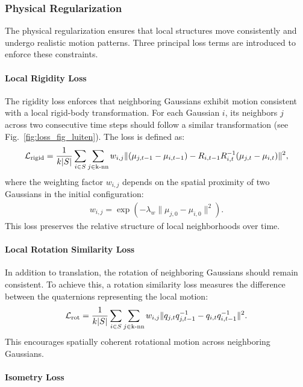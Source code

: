 \subsubsection{Physical Regularization}

The physical regularization ensures that local structures move consistently and undergo realistic motion patterns. 
Three principal loss terms are introduced to enforce these constraints.

\paragraph{Local Rigidity Loss}

The rigidity loss enforces that neighboring Gaussians exhibit motion consistent with a local rigid-body transformation. 
For each Gaussian \(i\), its neighbors \(j\) across two consecutive time steps should follow a similar transformation (see Fig.~\ref{fig:loss_fig_luiten}). 
The loss is defined as:
\begin{align}
\mathcal{L}_{\mathrm{rigid}} = \frac{1}{k|S|} \sum_{i \in S} \sum_{j \in \text{k-nn}} w_{i,j} \|(\mu_{j,t-1} - \mu_{i,t-1}) - R_{i,t-1} R_{i,t}^{-1} (\mu_{j,t} - \mu_{i,t})\|^2,
\end{align}
where the weighting factor \(w_{i,j}\) depends on the spatial proximity of two Gaussians in the initial configuration:
\begin{align}
w_{i,j} = \exp \left( -\lambda_w \|\mu_{j,0} - \mu_{i,0}\|^2 \right).
\end{align}
This loss preserves the relative structure of local neighborhoods over time.

\paragraph{Local Rotation Similarity Loss}

In addition to translation, the rotation of neighboring Gaussians should remain consistent. 
To achieve this, a rotation similarity loss measures the difference between the quaternions representing the local motion:
\begin{align}
\mathcal{L}_{\mathrm{rot}} = \frac{1}{k|S|} \sum_{i \in S} \sum_{j \in \text{k-nn}} w_{i,j} \|q_{j,t} q_{j,t-1}^{-1} - q_{i,t} q_{i,t-1}^{-1}\|^2.
\end{align}
This encourages spatially coherent rotational motion across neighboring Gaussians.

\paragraph{Isometry Loss}

